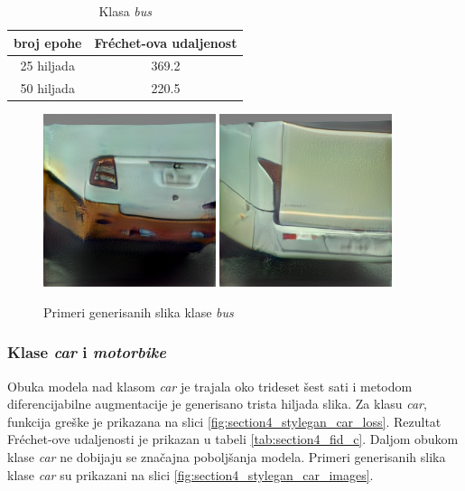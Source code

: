 \documentclass[12pt,oneside]{memoir}
\begin{document}
\begin{table}[!htb]
\caption{Klasa \textit{bus}}\label{tab:section4_fid_b}
\centering
    \begin{tabular}{c|c}
        broj epohe &  Fréchet-ova udaljenost \\
        \hline
        25 hiljada & 369.2 \\
        \hline
        50 hiljada & 220.5 \\
    \end{tabular}
\end{table}


\begin{figure}[!htbp]
\centering
    \includegraphics[width=0.45\textwidth]{matfmaster/stylegan/bus/image0.png}  \includegraphics[width=0.45\textwidth]{matfmaster/stylegan/bus/image8.png} 
\caption{Primeri generisanih slika klase \textit{bus}}
\label{fig:section4_stylegan_bus_images}
\end{figure}

\clearpage
\subsubsection{Klase \textit{car} i \textit{motorbike}}

Obuka modela nad klasom \textit{car} je trajala oko trideset šest sati i metodom diferencijabilne augmentacije je generisano trista hiljada slika. Za klasu \textit{car}, funkcija greške je prikazana na slici \ref{fig:section4_stylegan_car_loss}. Rezultat Fréchet-ove udaljenosti je prikazan u tabeli \ref{tab:section4_fid_c}. Daljom obukom klase \textit{car} ne dobijaju se značajna poboljšanja modela.
Primeri generisanih slika klase \textit{car} su prikazani na slici \ref{fig:section4_stylegan_car_images}.
\end{document}

